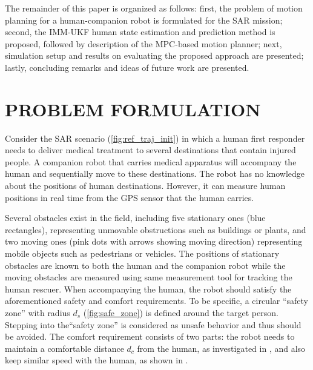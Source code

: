 \documentclass[letterpaper, 10 pt, conference]{ieeeconf}
\begin{document}
	The remainder of this paper is organized as follows:
	first, the problem of motion planning for a human-companion robot is formulated for the SAR mission;
	second, the IMM-UKF human state estimation and prediction method is proposed, followed by description of the MPC-based motion planner;
	next, simulation setup and results on evaluating the proposed approach are presented; 
	lastly, concluding remarks and ideas of future work are presented.
	
	\section{PROBLEM FORMULATION}\label{sec:formulation}
	Consider the SAR scenario (\cref{fig:ref_traj_init}) in which a human first responder needs to deliver medical treatment to several destinations that contain injured people. 
	A companion robot that carries medical apparatus will accompany the human and sequentially move to these destinations.
	The robot has no knowledge about the positions of human destinations.
	However, it can measure human positions in real time from the GPS sensor that the human carries.
	
	Several obstacles exist in the field, including five stationary ones (blue rectangles), representing unmovable obstructions such as buildings or plants, and two moving ones (pink dots with arrows showing moving direction) representing mobile objects such as pedestrians or vehicles.
	The positions of stationary obstacles are known to both the human and the companion robot while the moving obstacles are measured using same measurement tool for tracking the human rescuer.
	When accompanying the human, the robot should satisfy the aforementioned safety and comfort requirements.
	To be specific, a circular ``safety zone'' with radius $d_s$ (\cref{fig:safe_zone}) is defined around the target person.
	Stepping into the``safety zone'' is considered as unsafe behavior and thus should be avoided.
	The comfort requirement consists of two parts: the robot needs to maintain a comfortable distance $d_c$ from the human, as investigated in \cite{hall1968proxemics}, and also keep similar speed with the human, as shown in \cite{ref}.
	
\end{document}
